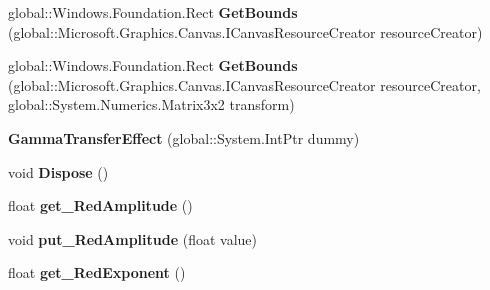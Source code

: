 \begin{DoxyCompactItemize}
global\+::\+Windows.\+Foundation.\+Rect {\bfseries Get\+Bounds} (global\+::\+Microsoft.\+Graphics.\+Canvas.\+I\+Canvas\+Resource\+Creator resource\+Creator)
\item 
\mbox{\label{class_microsoft_1_1_graphics_1_1_canvas_1_1_effects_1_1_gamma_transfer_effect_aa2d831514986da053da0423c9f99c841}} 
global\+::\+Windows.\+Foundation.\+Rect {\bfseries Get\+Bounds} (global\+::\+Microsoft.\+Graphics.\+Canvas.\+I\+Canvas\+Resource\+Creator resource\+Creator, global\+::\+System.\+Numerics.\+Matrix3x2 transform)
\item 
\mbox{\label{class_microsoft_1_1_graphics_1_1_canvas_1_1_effects_1_1_gamma_transfer_effect_acc80116adac830c588156332a0cbd9ec}} 
{\bfseries Gamma\+Transfer\+Effect} (global\+::\+System.\+Int\+Ptr dummy)
\item 
\mbox{\label{class_microsoft_1_1_graphics_1_1_canvas_1_1_effects_1_1_gamma_transfer_effect_a83bd3bcd2df4a6ade3ee108a25f92ac9}} 
void {\bfseries Dispose} ()
\item 
\mbox{\label{class_microsoft_1_1_graphics_1_1_canvas_1_1_effects_1_1_gamma_transfer_effect_ab74b1133eab4608c72e6c33e50c14a99}} 
float {\bfseries get\+\_\+\+Red\+Amplitude} ()
\item 
\mbox{\label{class_microsoft_1_1_graphics_1_1_canvas_1_1_effects_1_1_gamma_transfer_effect_ac877c0c4b86a5c1e90056a92dad7a161}} 
void {\bfseries put\+\_\+\+Red\+Amplitude} (float value)
\item 
\mbox{\label{class_microsoft_1_1_graphics_1_1_canvas_1_1_effects_1_1_gamma_transfer_effect_a744bfb7361792b436940014b783e3f6c}} 
float {\bfseries get\+\_\+\+Red\+Exponent} ()
\item 
\mbox{\label{class_microsoft_1_1_graphics_1_1_canvas_1_1_effects_1_1_gamma_transfer_effect_a8969e3ad451992d1f43567df17274e07}} 

\end{DoxyCompactItemize}
